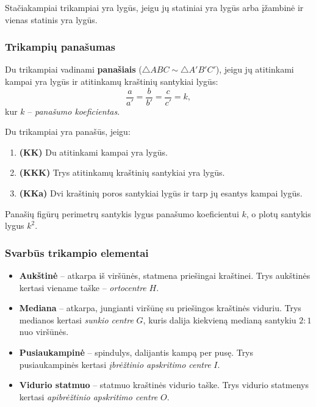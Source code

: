 \begin{tcolorbox}[colback=blue!5!white, colframe=blue!60!black, title=Stačiakampio trikampio lygybės požymis]
Stačiakampiai trikampiai yra lygūs, jeigu jų statiniai yra lygūs arba
įžambinė ir vienas statinis yra lygūs.
\end{tcolorbox}

\subsubsection*{Trikampių panašumas}

\begin{definition}
Du trikampiai vadinami \textbf{panašiais} ($\triangle ABC \sim \triangle A'B'C'$),
jeigu jų atitinkami kampai yra lygūs ir atitinkamų kraštinių santykiai lygūs:
\[
\frac{a}{a'} = \frac{b}{b'} = \frac{c}{c'} = k,
\]
kur $k$ – \emph{panašumo koeficientas}.
\end{definition}

\begin{theorem}
Du trikampiai yra panašūs, jeigu:
\begin{enumerate}
  \item \textbf{(KK)} Du atitinkami kampai yra lygūs.
  \item \textbf{(KKK)} Trys atitinkamų kraštinių santykiai yra lygūs.
  \item \textbf{(KKa)} Dvi kraštinių poros santykiai lygūs ir tarp jų esantys
        kampai lygūs.
\end{enumerate}
\end{theorem}

\begin{remark}
Panašių figūrų perimetrų santykis lygus panašumo koeficientui $k$,
o plotų santykis lygus $k^2$.
\end{remark}

\subsubsection*{Svarbūs trikampio elementai}

\begin{itemize}
  \item \textbf{Aukštinė} – atkarpa iš viršūnės, statmena priešingai kraštinei.
        Trys aukštinės kertasi viename taške – \emph{ortocentre} $H$.
  \item \textbf{Mediana} – atkarpa, jungianti viršūnę su priešingos kraštinės viduriu.
        Trys medianos kertasi \emph{sunkio centre} $G$, kuris dalija kiekvieną medianą
        santykiu $2:1$ nuo viršūnės.
  \item \textbf{Pusiaukampinė} – spindulys, dalijantis kampą per pusę.
        Trys pusiaukampinės kertasi \emph{įbrėžtinio apskritimo centre} $I$.
  \item \textbf{Vidurio statmuo} – statmuo kraštinės vidurio taške.
        Trys vidurio statmenys kertasi \emph{apibrėžtinio apskritimo centre} $O$.
\end{itemize}

